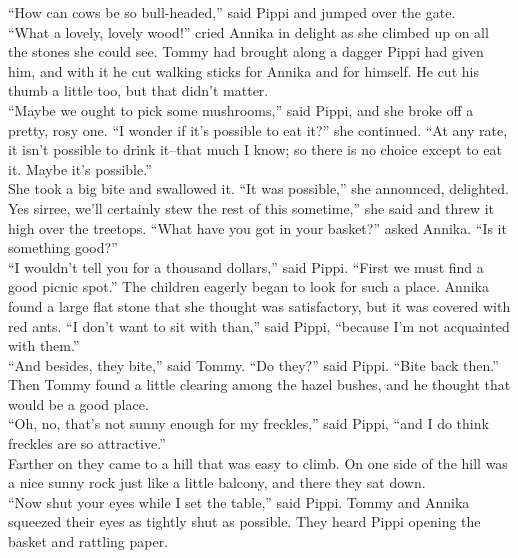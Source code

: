 \documentclass{standard}
\begin{document}
“How can cows be so bull-headed,” said Pippi and jumped over the gate.\\

“What a lovely, lovely wood!” cried Annika in delight as she climbed up on all the stones she could see. Tommy had brought along a dagger Pippi had given him, and with it he cut walking sticks for Annika and for himself. He cut his thumb a little too, but that didn’t matter.\\

“Maybe we ought to pick some mushrooms,” said Pippi, and she broke off a pretty, rosy one. “I wonder if it’s possible to eat it?” she continued. “At any rate, it isn’t possible to drink it--that much I know; so there is no choice except to eat it. Maybe it’s possible.”\\

She took a big bite and swallowed it. “It was possible,” she announced, delighted. Yes sirree, we’ll certainly stew the rest of this sometime,” she said and threw it high over the treetops. “What have you got in your basket?” asked Annika. “Is it something good?”\\

“I wouldn’t tell you for a thousand dollars,” said Pippi. “First we must find a good picnic spot.”
The children eagerly began to look for such a place. Annika found a large flat stone that she thought was satisfactory, but it was covered with red ants. “I don’t want to sit with than,” said Pippi, “because I’m not acquainted with them.”\\

“And besides, they bite,” said Tommy. “Do they?” said Pippi. “Bite back then.”\\

Then Tommy found a little clearing among the hazel bushes, and he thought that would be a good place.\\

“Oh, no, that’s not sunny enough for my freckles,” said Pippi, “and I do think freckles are so attractive.”\\

Farther on they came to a hill that was easy to climb. On one side of the hill was a nice sunny rock just like a little balcony, and there they sat down.\\

“Now shut your eyes while I set the table,” said Pippi. Tommy and Annika squeezed their eyes as tightly shut as possible. They heard Pippi opening the basket and rattling paper.\\
\end{document}
